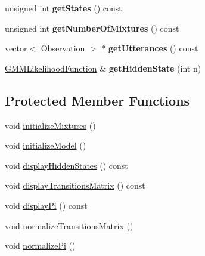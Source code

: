 \begin{DoxyCompactItemize}
\item 
\hypertarget{classspeech_1_1HMMLexicon_1_1MultivariateGaussianHMM_a80bcb1783824e8cb7308a50e429bd8e7}{unsigned int {\bfseries get\+States} () const }\label{classspeech_1_1HMMLexicon_1_1MultivariateGaussianHMM_a80bcb1783824e8cb7308a50e429bd8e7}

\item 
\hypertarget{classspeech_1_1HMMLexicon_1_1MultivariateGaussianHMM_a17115c85e8c7fcd54c3c63ee3f2d6f1a}{unsigned int {\bfseries get\+Number\+Of\+Mixtures} () const }\label{classspeech_1_1HMMLexicon_1_1MultivariateGaussianHMM_a17115c85e8c7fcd54c3c63ee3f2d6f1a}

\item 
\hypertarget{classspeech_1_1HMMLexicon_1_1MultivariateGaussianHMM_a427975ea95c2b02619e532f685b9d65d}{vector$<$ Observation $>$ $\ast$ {\bfseries get\+Utterances} () const }\label{classspeech_1_1HMMLexicon_1_1MultivariateGaussianHMM_a427975ea95c2b02619e532f685b9d65d}

\item 
\hypertarget{classspeech_1_1HMMLexicon_1_1MultivariateGaussianHMM_aa5da3fde3793582a817be5d2b16ee29d}{\hyperlink{classspeech_1_1HMMLexicon_1_1GMMLikelihoodFunction}{G\+M\+M\+Likelihood\+Function} \& {\bfseries get\+Hidden\+State} (int n)}\label{classspeech_1_1HMMLexicon_1_1MultivariateGaussianHMM_aa5da3fde3793582a817be5d2b16ee29d}

\end{DoxyCompactItemize}
\subsection*{Protected Member Functions}
\begin{DoxyCompactItemize}
\item 
void \hyperlink{classspeech_1_1HMMLexicon_1_1MultivariateGaussianHMM_a3f0b164425f6aaff583b732a6c43fd76}{initialize\+Mixtures} ()
\item 
void \hyperlink{classspeech_1_1HMMLexicon_1_1MultivariateGaussianHMM_a1b1f0ff3758589fc4c3b02edcb61f8fa}{initialize\+Model} ()
\item 
void \hyperlink{classspeech_1_1HMMLexicon_1_1MultivariateGaussianHMM_ae7f252a513057ace52a1f15f4eb6c608}{display\+Hidden\+States} () const 
\item 
void \hyperlink{classspeech_1_1HMMLexicon_1_1MultivariateGaussianHMM_ab84609dea2c481615cc2ff2c2d138f78}{display\+Transitions\+Matrix} () const 
\item 
void \hyperlink{classspeech_1_1HMMLexicon_1_1MultivariateGaussianHMM_a06c6da67bd596f06d8c930c9468621fd}{display\+Pi} () const 
\item 
void \hyperlink{classspeech_1_1HMMLexicon_1_1MultivariateGaussianHMM_a9c023c2366a39b51fee449fbd9273ed2}{normalize\+Transitions\+Matrix} ()
\item 
void \hyperlink{classspeech_1_1HMMLexicon_1_1MultivariateGaussianHMM_ab6ef6908676327b67ab30806ec1f7752}{normalize\+Pi} ()
\end{DoxyCompactItemize}
